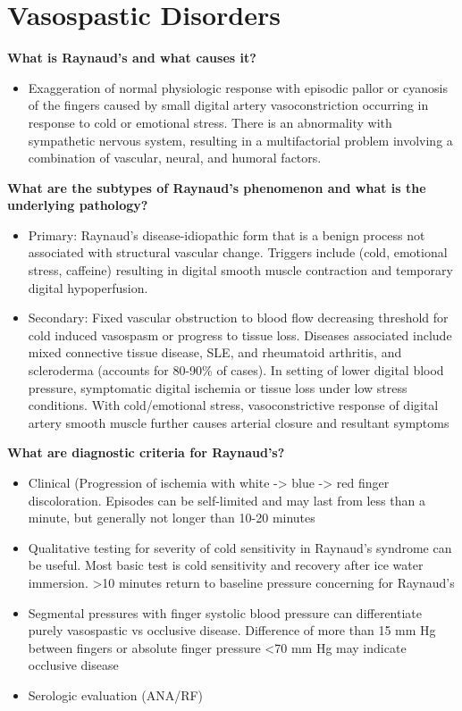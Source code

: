 \documentclass[
]{book}
\providecommand{\tightlist}{%
  \setlength{\itemsep}{0pt}\setlength{\parskip}{0pt}}
\begin{document}
\hypertarget{vasospastic-disorders}{%
\section{Vasospastic Disorders}\label{vasospastic-disorders}}

\textbf{What is Raynaud's and what causes it?} \citep{shuja117UpperExtremity, landry141RaynaudPhenomenon2019}

\begin{itemize}
\tightlist
\item
  Exaggeration of normal physiologic response with episodic pallor or
  cyanosis of the fingers caused by small digital artery
  vasoconstriction occurring in response to cold or emotional stress.
  There is an abnormality with sympathetic nervous system, resulting
  in a multifactorial problem involving a combination of vascular,
  neural, and humoral factors.
\end{itemize}

\textbf{What are the subtypes of Raynaud's phenomenon and what is the
underlying pathology?}

\begin{itemize}
\item
  Primary: Raynaud's disease-idiopathic form that is a benign process
  not associated with structural vascular change. Triggers include
  (cold, emotional stress, caffeine) resulting in digital smooth
  muscle contraction and temporary digital hypoperfusion.
\item
  Secondary: Fixed vascular obstruction to blood flow decreasing
  threshold for cold induced vasospasm or progress to tissue loss.
  Diseases associated include mixed connective tissue disease, SLE,
  and rheumatoid arthritis, and scleroderma (accounts for 80-90\% of
  cases). In setting of lower digital blood pressure, symptomatic
  digital ischemia or tissue loss under low stress conditions. With
  cold/emotional stress, vasoconstrictive response of digital artery
  smooth muscle further causes arterial closure and resultant symptoms
\end{itemize}

\textbf{What are diagnostic criteria for Raynaud's?}

\begin{itemize}
\item
  Clinical (Progression of ischemia with white -\textgreater{} blue -\textgreater{} red finger
  discoloration. Episodes can be self-limited and may last from less
  than a minute, but generally not longer than 10-20 minutes~
\item
  Qualitative testing for severity of cold sensitivity in Raynaud's
  syndrome can be useful. Most basic test is cold sensitivity and
  recovery after ice water immersion. \textgreater10 minutes return to baseline
  pressure concerning for Raynaud's
\item
  Segmental pressures with finger systolic blood pressure can
  differentiate purely vasospastic vs occlusive disease. Difference of
  more than 15 mm Hg between fingers or absolute finger pressure \textless70
  mm Hg may indicate occlusive disease
\item
  Serologic evaluation (ANA/RF)
\end{itemize}
\end{document}
